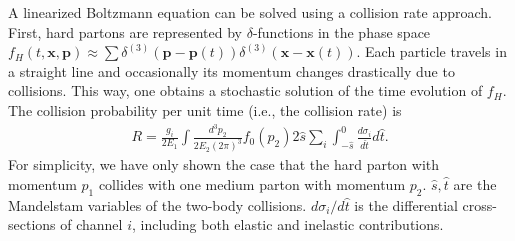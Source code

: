 \documentclass[aps, prc, reprint, amsmath, groupedaddress, nofootinbib]{revtex4-1}
\begin{document}
A linearized Boltzmann equation can be solved using a collision rate approach.
First, hard partons are represented by $\delta$-functions in the phase space $f_H(t,\mathbf{x},\mathbf{p}) \approx \sum \delta^{(3)}(\mathbf{p}-\mathbf{p}(t))\delta^{(3)}(\mathbf{x}-\mathbf{x}(t))$.
Each particle travels in a straight line and occasionally its momentum changes drastically due to collisions.
This way, one obtains a stochastic solution of the time evolution of $f_H$.
The collision probability per unit time (i.e., the collision rate) is 
\begin{eqnarray}
R = \frac{g_i}{2E_1}\int  \frac{d^3p_2}{2E_2(2\pi)^3} f_0(p_2)2\hat{s} \sum_i \int_{-\hat{s}}^{0}\frac{d\sigma_i}{d\hat{t}}d\hat{t}.
\label{eq:incoh_rate}
\end{eqnarray}
For simplicity, we have only shown the case that the hard parton with momentum $p_1$ collides with one medium parton with momentum $p_2$.
$\hat{s}, \hat{t}$ are the Mandelstam variables of the two-body collisions. 
$d\sigma_i/d\hat{t}$ is the differential cross-sections of channel $i$, including both elastic and inelastic contributions.
\end{document}
